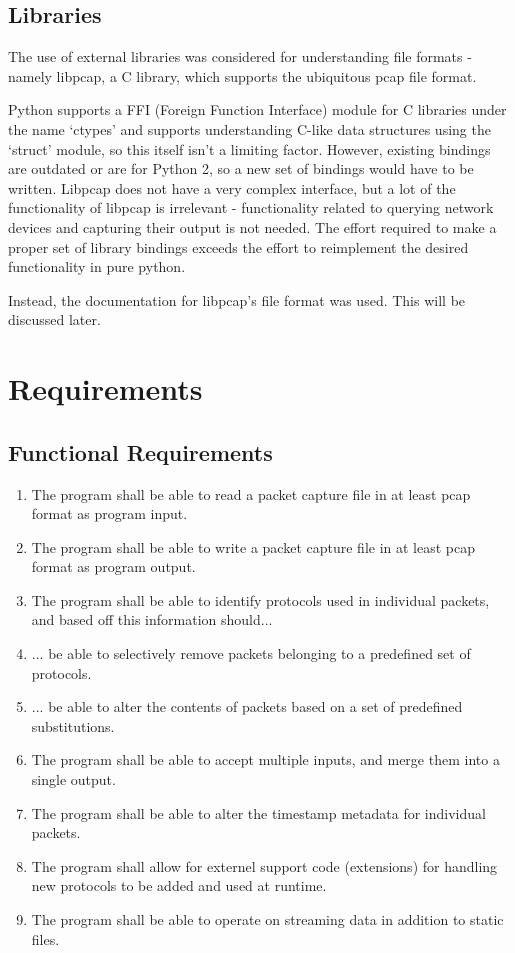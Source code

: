 \documentclass[10pt,a4paper,notitlepage]{report}
\begin{document}
\section{Libraries}
The use of external libraries was considered for understanding file formats - namely libpcap, a C library, which supports the ubiquitous pcap file format.

Python supports a FFI (Foreign Function Interface) module for C libraries under the name `ctypes' and supports understanding C-like data structures using the `struct' module, so this itself isn't a limiting factor.
However, existing bindings are outdated or are for Python 2, so a new set of bindings would have to be written. Libpcap does not have a very complex interface, but a lot of the functionality of libpcap is irrelevant - functionality related to querying network devices and capturing their output is not needed. The effort required to make a proper set of library bindings exceeds the effort to reimplement the desired functionality in pure python.

Instead, the documentation for libpcap's file format was used. This will be discussed later.

\chapter{Requirements}
\section{Functional Requirements}

\begin{enumerate}[label=\bfseries FR\arabic*:]
\item \label{fr:1} The program shall be able to read a packet capture file in at least pcap format as program input.
\item \label{fr:2} The program shall be able to write a packet capture file in at least pcap format as program output.
\item \label{fr:3} The program shall be able to identify protocols used in individual packets, and based off this information should...
\item \label{fr:4} ... be able to selectively remove packets belonging to a predefined set of protocols.
\item \label{fr:5} ... be able to alter the contents of packets based on a set of predefined substitutions.
\item \label{fr:6} The program shall be able to accept multiple inputs, and merge them into a single output.
\item \label{fr:7} The program shall be able to alter the timestamp metadata for individual packets.
\item \label{fr:8} The program shall allow for externel support code (extensions) for handling new protocols to be added and used at runtime.
\item \label{fr:9} The program shall be able to operate on streaming data in addition to static files.
\end{enumerate}
\end{document}
